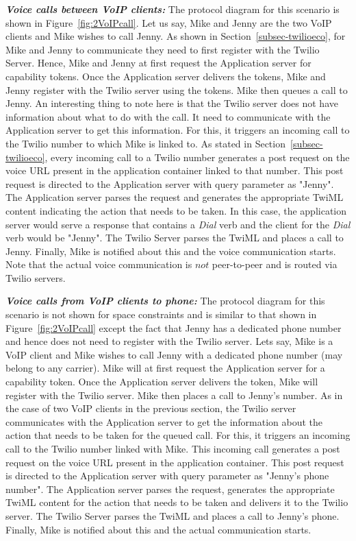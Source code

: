 \emph{\textbf{Voice calls between VoIP clients:} }
The protocol diagram for this scenario is shown in Figure~\ref{fig:2VoIPcall}. Let us say, Mike and Jenny are the two VoIP clients and Mike wishes to call Jenny. As shown in Section~\ref{subsec-twilioeco}, for Mike and Jenny to communicate they need to first register with the Twilio Server. Hence, Mike and Jenny at first request the Application server for capability tokens. Once the Application server delivers the tokens, Mike and Jenny register with the Twilio server using the tokens. Mike then queues a call to Jenny. An interesting thing to note here is that the Twilio server does not have information about what to do with the call. It need to communicate with the Application server to get this information. For this, it triggers an incoming call to the Twilio number to which Mike is linked to. As stated in Section~\ref{subsec-twilioeco}, every incoming call to a Twilio number generates a post request on the voice URL present in the application container linked to that number. This post request is directed to the Application server with query parameter as "Jenny". The Application server parses the request and generates the appropriate TwiML content indicating the action that needs to be taken. In this case, the application server would serve a response that contains a \textit{Dial} verb and the client for the \textit{Dial} verb would be "Jenny". The Twilio Server parses the TwiML and places a call to Jenny. Finally, Mike is notified about this and the voice communication starts. Note that the actual voice communication is $not$ peer-to-peer and is routed via Twilio servers.  

\emph{\textbf{Voice calls from VoIP clients to phone:} }
The protocol diagram for this scenario is not shown for space constraints and is similar to that shown in Figure~\ref{fig:2VoIPcall} except the fact that Jenny has a dedicated phone number and hence does not need to register with the Twilio server. Lets say, Mike is a VoIP client and Mike wishes to call Jenny with a dedicated phone number (may belong to any carrier). Mike will at first request the Application server for a capability token. Once the Application server delivers the token, Mike will register with the Twilio server. Mike then places a call to Jenny's number. As in the case of two VoIP clients in the previous section, the Twilio server communicates with the Application server to get the information about the action that needs to be taken for the queued call. For this, it triggers an incoming call to the Twilio number linked with Mike. This incoming call generates a post request on the voice URL present in the application container. This post request is directed to the Application server with query parameter as "Jenny's phone number". The Application server parses the request, generates the appropriate TwiML content for the action that needs to be taken and delivers it to the Twilio server. The Twilio Server parses the TwiML and places a call to Jenny's phone. Finally, Mike is notified about this and the actual communication starts. 


